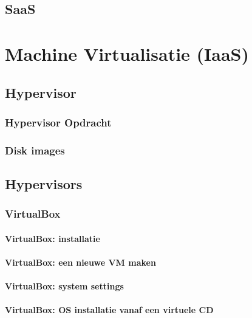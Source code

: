 \documentclass[a4paper,12pt,twoside,openright,titlepage]{book}
\begin{document}
\section{SaaS}


\chapter{Machine Virtualisatie (IaaS)}

\section{Hypervisor}

\subsection{Hypervisor Opdracht}

\subsection{Disk images}

\section{Hypervisors}

\subsection{VirtualBox}

\subsubsection{VirtualBox: installatie}

\subsubsection{VirtualBox: een nieuwe VM maken}

\subsubsection{VirtualBox: system settings}

\subsubsection{VirtualBox: OS installatie vanaf een virtuele CD}

\end{document}

